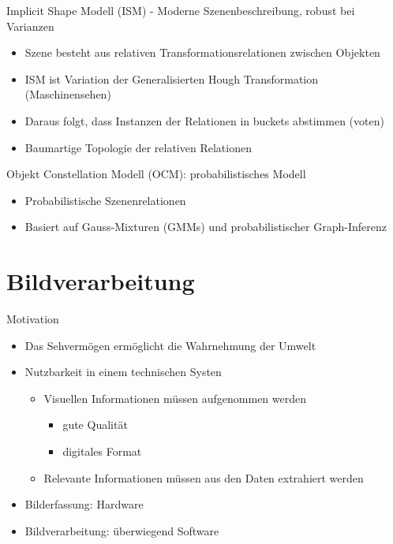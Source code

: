 \documentclass[paper=a4, fontsize=11pt]{scrartcl} %
\numberwithin{equation}{section} %
\numberwithin{figure}{section} %
\numberwithin{table}{section} %
\begin{document}
Implicit Shape Modell (ISM) - Moderne Szenenbeschreibung, robust bei Varianzen
\begin{itemize}
\item Szene besteht aus relativen Transformationsrelationen zwischen Objekten
\item ISM ist Variation der Generalisierten Hough Transformation (Maschinensehen)
\item Daraus folgt, dass Instanzen der Relationen in buckets abstimmen (voten)
\item Baumartige Topologie der relativen Relationen
\end{itemize}

Objekt Constellation Modell (OCM): probabilistisches Modell
\begin{itemize}
\item Probabilistische Szenenrelationen
\item Basiert auf Gauss-Mixturen (GMMs) und probabilistischer Graph-Inferenz
\end{itemize}

\section{Bildverarbeitung}

Motivation
\begin{itemize}
\item Das Sehvermögen ermöglicht die Wahrnehmung der Umwelt
\item Nutzbarkeit in einem technischen Systen
\begin{itemize}
\item Visuellen Informationen müssen aufgenommen werden
\begin{itemize}
\item gute Qualität
\item digitales Format
\end{itemize}
\item Relevante Informationen müssen aus den Daten extrahiert werden
\end{itemize}
\item Bilderfassung: Hardware
\item Bildverarbeitung: überwiegend Software
\end{itemize}
\end{document}
